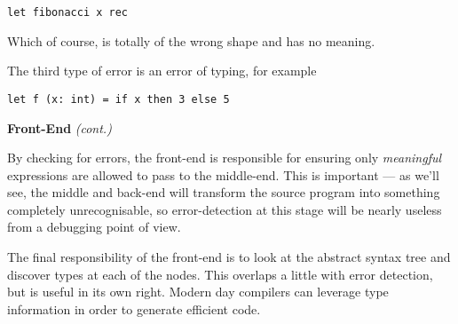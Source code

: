 \begin{minipage}[t]{0.85\textwidth}
\begin{verbatim}
let fibonacci x rec
\end{verbatim}

    Which of course, is totally of the wrong shape and has no meaning. 

    The third type of error is an error of typing, for example

\begin{verbatim}
let f (x: int) = if x then 3 else 5
\end{verbatim}

\end{minipage}

\begin{minipage}[t]{0.15\textwidth}
\textbf{\sffamily Front-End} \textit{\sffamily (cont.)}    
\end{minipage}%
\begin{minipage}[t]{0.85\textwidth}    

    By checking for errors, the front-end is responsible for ensuring only \emph{meaningful} expressions are allowed to pass to the middle-end. This is important --- as we'll see, the middle and back-end will transform the source program into something completely unrecognisable, so error-detection at this stage will be nearly useless from a debugging point of view.

    The final responsibility of the front-end is to look at the abstract syntax tree and discover types at each of the nodes. This overlaps a little with error detection, but is useful in its own right. Modern day compilers can leverage type information in order to generate efficient code.
\end{minipage}

